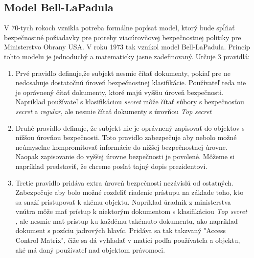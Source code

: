 \subsection{Model Bell-LaPadula} 
V 70-tych rokoch vznikla potreba formálne popísať model, ktorý bude spĺňať bezpečnostné požiadavky pre potreby viacúrovňovej bezpečnostnej politiky pre Ministerstvo Obrany USA.
V roku 1973 tak vznikol model Bell-LaPadula. Princíp tohto modelu je jednoduchý  a matematicky jasne zadefinovaný. Určuje 3 pravidlá: 
\begin{enumerate}
	\item Prvé pravidlo definuje,že subjekt nesmie čítať dokumenty, pokiaľ pre ne nedosahuje dostatočnú úroveň bezpečnostnej klasifikácie. Používateľ teda nie je oprávnený čítať dokumenty, ktoré majú vyššiu úroveň bezpečnosti. Napríklad používateľ s klasifikáciou  \emph{secret} môže čítať súbory s bezpečnosťou \emph{secret} a  \emph{regular}, ale nesmie čítať dokumenty s úrovňou  \emph{Top secret}
	\item Druhé pravidlo definuje, že subjekt nie je oprávnený zapisovať do objektov s nižšou úrovňou bezpečnosti. Toto pravidlo zabezpečuje aby nebolo možné neúmyselne kompromitovať informácie do nižšej bezpečnostnej úrovne. Naopak zapisovanie do vyššej úrovne bezpečnosti je povolené. Môžeme si napríklad predstaviť, že chceme poslať tajný dopis prezidentovi. 
	\item Tretie pravidlo pridáva extra úroveň bezpečnosti nezávislú od ostatných. Zabezpečuje aby bolo možné rozdeliť riadenie prístupu na základe toho, kto sa snaží pristupovať k akému objektu. Napríklad úradník z ministerstva vnútra môže mať prístup k niektorým dokumentom s klasifikáciou \emph{Top secret} , ale nesmie mať prístup ku každému takémuto dokumentu, ako napríklad dokument s pozíciu jadrových hlavíc. Pridáva sa tak  takzvaný "Access Control Matrix", čiže sa dá vyhľadať v matici podľa používateľa a objektu, aké má daný používateľ nad objektom právomoci.
\end{enumerate}









